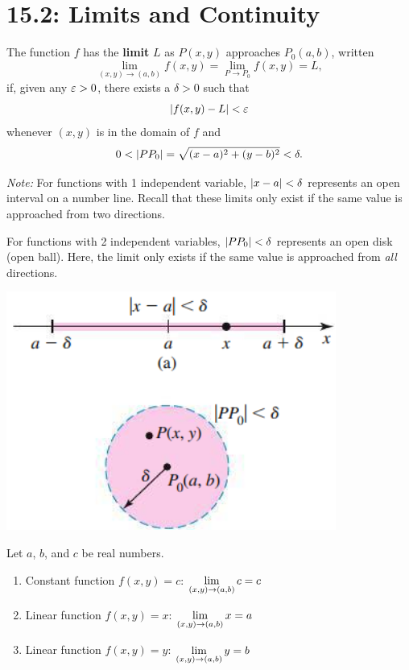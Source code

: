\documentclass[mathNotesPreamble]{subfiles}
\begin{document}
\section{15.2: Limits and Continuity}

  \begin{defn*}
    The function $f$ has the \textbf{limit} $L$ as $P(x,y)$ approaches $P_0(a,b)$, written
      \[\lim_{(x,y)\to (a,b)} f(x,y)=\lim_{P\to P_0}f(x,y)=L,\]
    if, given any $\varepsilon>0$, there exists a $\delta>0$ such that
      \[{\left\vert f(x,y)-L\right\vert}<\varepsilon\]
    whenever $(x,y)$ is in the domain of $f$ and 
      \[0< {\left\vert PP_0\right\vert}=\sqrt{(x-a)^2+(y-b)^2}<\delta.\]
  \end{defn*}
  \textit{Note:} For functions with 1 independent variable, ${\left\vert x-a\right\vert}<\delta$ represents an open interval on a number line. Recall that these limits only exist if the same value is approached from two directions.
  
  For functions with 2 independent variables, ${\left\vert PP_0\right\vert}<\delta$ represents an open disk (open ball). Here, the limit only exists if the same value is approached from \textit{all} directions.

  \begin{center}
    \includegraphics[width=0.5\linewidth]{images/briggs_15_02/fig15_19}
  \end{center}
  \pagebreak

  \begin{thmBox*}
    Let $a$, $b$, and $c$ be real numbers.
    \begin{enumerate}
      \item Constant function $f(x,y)=c$: \tab $\displaystyle\lim_{(x,y)\to (a,b)} c=c$
      \item Linear function $f(x,y)=x$: \tab $\displaystyle\lim_{(x,y)\to (a,b)} x=a$
      \item Linear function $f(x,y)=y$: \tab $\displaystyle\lim_{(x,y)\to (a,b)} y=b$
    \end{enumerate}
  \end{thmBox*}
\end{document}
